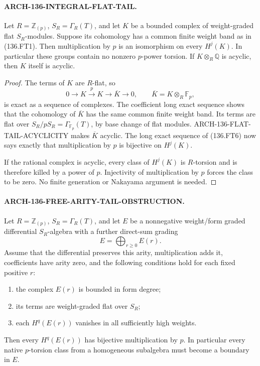 \paragraph{ARCH-136-INTEGRAL-FLAT-TAIL.}
Let \(R=\mathbb Z_{(p)}\), \(S_R=\Gamma_R(T)\), and let \(K\)
be a bounded complex of weight-graded flat \(S_R\)-modules.
Suppose its cohomology has a common finite weight band as in
(136.FT1). Then multiplication by \(p\) is an isomorphism on
every \(H^j(K)\). In particular these groups contain no nonzero
\(p\)-power torsion. If \(K\otimes_R\mathbb Q\) is acyclic,
then \(K\) itself is acyclic.

\begin{proof}
The terms of \(K\) are \(R\)-flat, so
\[
 0\longrightarrow K\xrightarrow{p}K
              \longrightarrow\overline K\longrightarrow0,
 \qquad\overline K=K\otimes_R\mathbb F_p,
                                                        \tag{136.FT6}
\]
is exact as a sequence of complexes. The coefficient long exact
sequence shows that the cohomology of \(\overline K\) has the
same common finite weight band. Its terms are flat over
\(S_R/pS_R=\Gamma_{\mathbb F_p}(T)\), by base change of flat
modules. ARCH-136-FLAT-TAIL-ACYCLICITY makes \(\overline K\)
acyclic. The long exact sequence of (136.FT6) now says exactly
that multiplication by \(p\) is bijective on \(H^j(K)\).

If the rational complex is acyclic, every class of \(H^j(K)\)
is \(R\)-torsion and is therefore killed by a power of \(p\).
Injectivity of multiplication by \(p\) forces the class to be
zero. No finite generation or Nakayama argument is needed.
\end{proof}

\paragraph{ARCH-136-FREE-ARITY-TAIL-OBSTRUCTION.}
Let \(R=\mathbb Z_{(p)}\), \(S_R=\Gamma_R(T)\), and let
\(E\) be a nonnegative weight/form graded differential
\(S_R\)-algebra with a further direct-sum grading
\[
                  E=\bigoplus_{r\geq0}E(r).
                                                        \tag{136.FT7}
\]
Assume that the differential preserves this arity, multiplication
adds it, coefficients have arity zero, and the following conditions
hold for each fixed positive \(r\):
\begin{enumerate}
\item the complex \(E(r)\) is bounded in form degree;
\item its terms are weight-graded flat over \(S_R\);
\item each \(H^q(E(r))\) vanishes in all sufficiently high weights.
\end{enumerate}
Then every \(H^q(E(r))\) has bijective multiplication by \(p\).
In particular every native \(p\)-torsion class from a homogeneous
subalgebra must become a boundary in \(E\).

